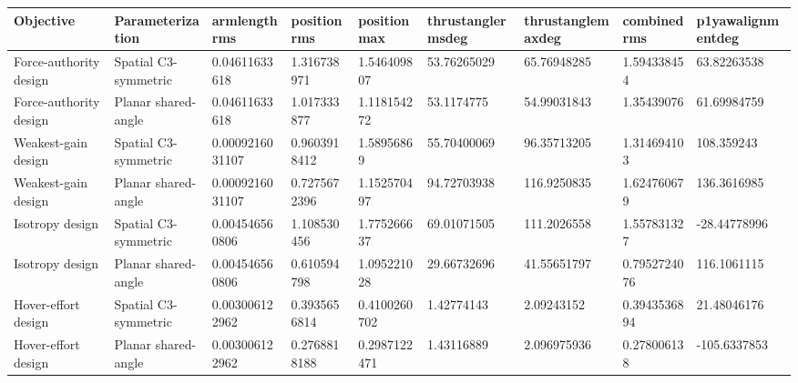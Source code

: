 \begin{tabular}{@{}lllllllll@{}}
\toprule
Objective & Parameterization & armlengthrms & positionrms & positionmax & thrustanglermsdeg & thrustanglemaxdeg & combinedrms & p1yawalignmentdeg \\
\midrule
Force-authority design & Spatial C3-symmetric & 0.04611633618 & 1.316738971 & 1.546409807 & 53.76265029 & 65.76948285 & 1.594338454 & 63.82263538 \\
Force-authority design & Planar shared-angle & 0.04611633618 & 1.017333877 & 1.118154272 & 53.1174775 & 54.99031843 & 1.35439076 & 61.69984759 \\
Weakest-gain design & Spatial C3-symmetric & 0.0009216031107 & 0.9603918412 & 1.58956869 & 55.70400069 & 96.35713205 & 1.314694103 & 108.359243 \\
Weakest-gain design & Planar shared-angle & 0.0009216031107 & 0.7275672396 & 1.152570497 & 94.72703938 & 116.9250835 & 1.624760679 & 136.3616985 \\
Isotropy design & Spatial C3-symmetric & 0.004546560806 & 1.108530456 & 1.775266637 & 69.01071505 & 111.2026558 & 1.557831327 & -28.44778996 \\
Isotropy design & Planar shared-angle & 0.004546560806 & 0.610594798 & 1.095221028 & 29.66732696 & 41.55651797 & 0.7952724076 & 116.1061115 \\
Hover-effort design & Spatial C3-symmetric & 0.003006122962 & 0.3935656814 & 0.4100260702 & 1.42774143 & 2.09243152 & 0.3943536894 & 21.48046176 \\
Hover-effort design & Planar shared-angle & 0.003006122962 & 0.2768818188 & 0.2987122471 & 1.43116889 & 2.096975936 & 0.278006138 & -105.6337853 \\
\bottomrule
\end{tabular}
